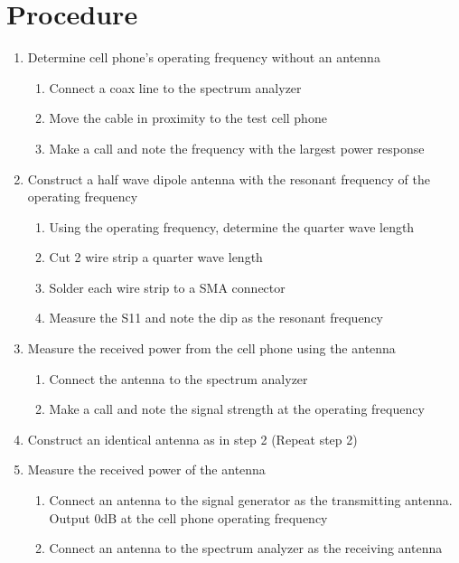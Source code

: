 \documentclass[journal]{IEEEtran}
\begin{document}
\section{Procedure}
\begin{enumerate}
    \item Determine cell phone's operating frequency without an antenna
          \begin{enumerate}
              \item Connect a coax line to the spectrum analyzer
              \item Move the cable in proximity to the test cell phone
              \item Make a call and note the frequency with the largest power response
          \end{enumerate}
    \item Construct a half wave dipole antenna with the resonant frequency of the operating frequency
          \begin{enumerate}
              \item Using the operating frequency, determine the quarter wave length
              \item Cut 2 wire strip a quarter wave length
              \item Solder each wire strip to a SMA connector
              \item Measure the S11 and note the dip as the resonant frequency
          \end{enumerate}
    \item Measure the received power from the cell phone using the antenna
          \begin{enumerate}
              \item Connect the antenna to the spectrum analyzer
              \item Make a call and note the signal strength at the operating frequency
          \end{enumerate}
    \item Construct an identical antenna as in step 2 (Repeat step 2)
    \item Measure the received power of the antenna
          \begin{enumerate}
              \item Connect an antenna to the signal generator as the transmitting antenna. Output 0dB at the cell phone operating frequency
              \item Connect an antenna to the spectrum analyzer as the receiving antenna

\end{enumerate}
\end{enumerate}
\end{document}
